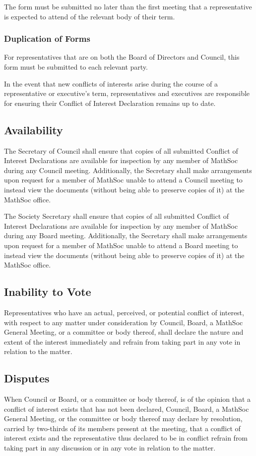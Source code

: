 The form must be submitted no later than the first meeting that a representative is expected to attend of the relevant body of their term.

\subsubsection{Duplication of Forms}

For representatives that are on both the Board of Directors and Council, this form must be submitted to each relevant party. 



In the event that new conflicts of interests arise during the course of a representative or executive's term, representatives and executives are responsible for ensuring their Conflict of Interest Declaration remains up to date.

\subsection{Availability} 

The Secretary of Council shall ensure that copies of all submitted Conflict of Interest Declarations are available for inspection by any member of MathSoc during any Council meeting. Additionally, the Secretary shall make arrangements upon request for a member of MathSoc unable to attend a Council meeting to instead view the documents (without being able to preserve copies of it) at the MathSoc office.

\noindent 
The Society Secretary shall ensure that copies of all submitted Conflict of Interest Declarations are available for inspection by any member of MathSoc during any Board meeting. Additionally, the Secretary shall make arrangements upon request for a member of MathSoc unable to attend a Board meeting to instead view the documents (without being able to preserve copies of it) at the MathSoc office.


\subsection{Inability to Vote} 

Representatives who have an actual, perceived, or potential conflict of interest, with respect to any matter under consideration by Council, Board, a MathSoc General Meeting, or a committee or body thereof, shall declare the nature and extent of the interest immediately and refrain from taking part in any vote in relation to the matter.

\subsection{Disputes} 

When Council or Board, or a committee or body thereof, is of the opinion that a conflict of interest exists that has not been declared, Council, Board, a MathSoc General Meeting, or the committee or body thereof may declare by resolution, carried by two-thirds of its members present at the meeting, that a conflict of interest exists and the representative thus declared to be in conflict refrain from taking part in any discussion or in any vote in relation to the matter.
